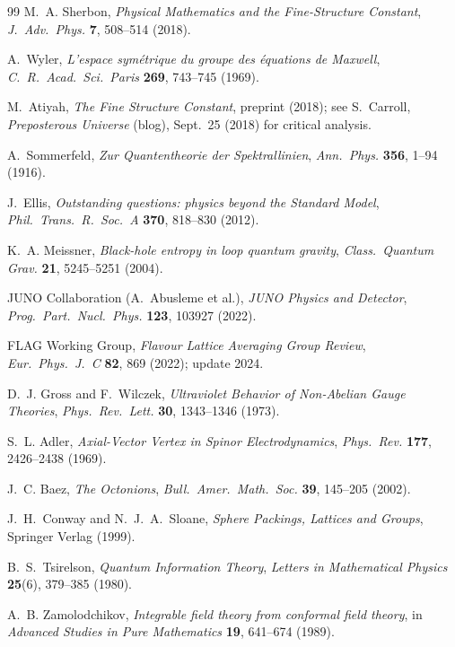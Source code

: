 \documentclass[10pt,a4paper]{article}
\begin{document}
\begin{thebibliography}{99}
M.~A. Sherbon,
\textit{Physical Mathematics and the Fine-Structure Constant},
\textit{J.\ Adv.\ Phys.} \textbf{7}, 508--514 (2018).

A.~Wyler,
\textit{L'espace sym\'{e}trique du groupe des \'{e}quations de Maxwell},
\textit{C.\ R.\ Acad.\ Sci.\ Paris} \textbf{269}, 743--745 (1969).

M.~Atiyah,
\textit{The Fine Structure Constant}, preprint (2018);
see S.~Carroll, \textit{Preposterous Universe} (blog), Sept.\ 25 (2018) for critical analysis.

A.~Sommerfeld,
\textit{Zur Quantentheorie der Spektrallinien},
\textit{Ann.\ Phys.} \textbf{356}, 1--94 (1916).

J.~Ellis,
\textit{Outstanding questions: physics beyond the Standard Model},
\textit{Phil.\ Trans.\ R.\ Soc.\ A} \textbf{370}, 818--830 (2012).

K.~A. Meissner,
\textit{Black-hole entropy in loop quantum gravity},
\textit{Class.\ Quantum Grav.} \textbf{21}, 5245--5251 (2004).

JUNO Collaboration (A.~Abusleme et al.),
\textit{JUNO Physics and Detector},
\textit{Prog.\ Part.\ Nucl.\ Phys.} \textbf{123}, 103927 (2022).

FLAG Working Group,
\textit{Flavour Lattice Averaging Group Review},
\textit{Eur.\ Phys.\ J.\ C} \textbf{82}, 869 (2022); update 2024.

D.~J. Gross and F.~Wilczek,
\textit{Ultraviolet Behavior of Non-Abelian Gauge Theories},
\textit{Phys.\ Rev.\ Lett.} \textbf{30}, 1343--1346 (1973).

S.~L. Adler,
\textit{Axial-Vector Vertex in Spinor Electrodynamics},
\textit{Phys.\ Rev.} \textbf{177}, 2426--2438 (1969).

J.~C. Baez,
\textit{The Octonions},
\textit{Bull.\ Amer.\ Math.\ Soc.} \textbf{39}, 145--205 (2002).

J.~H.~Conway and N.~J.~A.~Sloane,
\textit{Sphere Packings, Lattices and Groups},
Springer Verlag (1999).

B.~S.~Tsirelson,
\textit{Quantum Information Theory},
\textit{Letters in Mathematical Physics} \textbf{25}(6), 379--385 (1980).

A.~B. Zamolodchikov,
\textit{Integrable field theory from conformal field theory},
in \textit{Advanced Studies in Pure Mathematics} \textbf{19}, 641--674 (1989).


\end{thebibliography}
\end{document}
